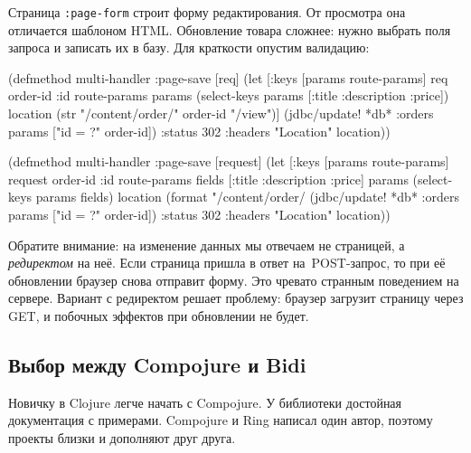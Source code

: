 \fi

Страница \verb|:page-form| строит форму редактирования. От просмотра она
отличается шаблоном HTML. Обновление товара сложнее: нужно выбрать поля запроса
и записать их в базу. Для краткости опустим валидацию:

\ifx\DEVICETYPE\MOBILE

\begin{english}
  \begin{clojure}
(defmethod multi-handler :page-save
  [req]
  (let [{:keys [params route-params]} req
        {order-id :id} route-params
        params (select-keys params
                 [:title :description
                  :price])
        location (str "/content/order/"
                   order-id "/view")]
    (jdbc/update! *db* :orders
      params ["id = ?" order-id])
    {:status 302
     :headers {"Location" location}}))
  \end{clojure}
\end{english}

\else

\begin{english}
  \begin{clojure}
(defmethod multi-handler :page-save
  [request]
  (let [{:keys [params route-params]} request
        {order-id :id} route-params
        fields [:title :description :price]
        params (select-keys params fields)
        location (format "/content/order/%
    (jdbc/update! *db* :orders params ["id = ?" order-id])
    {:status 302
     :headers {"Location" location}}))
  \end{clojure}
\end{english}

\fi



Обратите внимание: на изменение данных мы отвечаем не страницей, а
\emph{редиректом} на неё. Если страница пришла в ответ на~POST-запрос, то
при её обновлении браузер снова отправит форму. Это чревато странным
поведением на сервере. Вариант с редиректом решает проблему: браузер загрузит
страницу через GET, и побочных эффектов при обновлении не будет.

\subsection{Выбор между Compojure и Bidi}

Новичку в Clojure легче начать с Compojure. У библиотеки достойная документация
с примерами. Compojure и Ring написал один автор, поэтому проекты близки и
дополняют друг друга.

